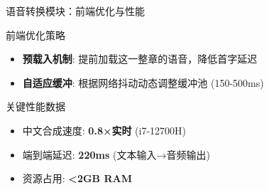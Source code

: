 \documentclass{beamer}
\begin{document}
	\begin{frame}{语音转换模块：前端优化与性能}
		\begin{block}{前端优化策略}
			\begin{itemize}
				\item \textbf{预载入机制}: 提前加载这一整章的语音，降低首字延迟
				\item \textbf{自适应缓冲}: 根据网络抖动动态调整缓冲池 (150-500ms)
			\end{itemize}
		\end{block}
		\begin{alertblock}{关键性能数据}
			\begin{itemize}
				\item 中文合成速度: \textbf{0.8×实时} (i7-12700H)
				\item 端到端延迟: \textbf{220ms} (文本输入→音频输出)
				\item 资源占用: \textbf{<2GB RAM}
			\end{itemize}
		\end{alertblock}
	\end{frame}
	
	
\end{document}
